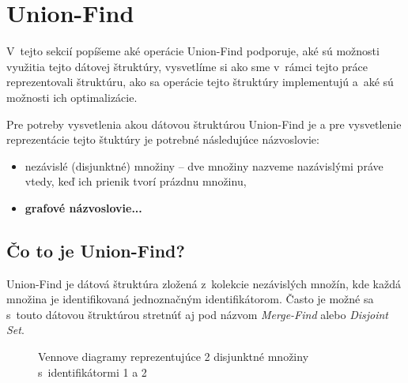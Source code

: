 \chapter{Union-Find} 

V~tejto sekcií popíšeme aké operácie Union-Find podporuje, aké sú možnosti využitia tejto dátovej štruktúry, vysvetlíme si ako sme v~rámci tejto práce reprezentovali štruktúru, ako sa operácie tejto štruktúry implementujú a~aké sú možnosti ich optimalizácie.

Pre potreby vysvetlenia akou dátovou štruktúrou Union-Find je a pre vysvetlenie reprezentácie tejto štuktúry je potrebné následujúce názvoslovie:
\begin{itemize}
    \item nezávislé (disjunktné) množiny -- dve množiny nazveme nazávislými práve vtedy, keď ich prienik tvorí prázdnu množinu,
    \item \textbf{grafové názvoslovie...}
\end{itemize}


\section{Čo to je Union-Find?} \label{union-find_uvod}

Union-Find je dátová štruktúra zložená z~kolekcie nezávislých množín, kde každá množina je identifikovaná jednoznačným identifikátorom. Často je možné sa s~touto dátovou štruktúrou stretnúť aj pod názvom \emph{Merge-Find} alebo \emph{Disjoint Set}.

\begin{figure}[H]
    \centering
    \captionsetup{justification=centering}
    \caption{Vennove diagramy reprezentujúce 2 disjunktné množiny s~identifikátormi 1 a 2}
    \label{fig:venn}
\end{figure}

